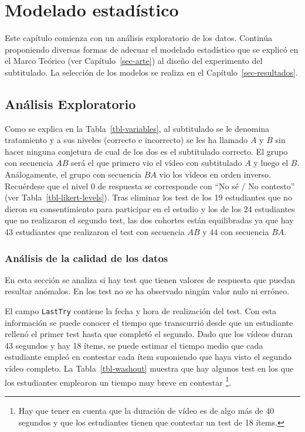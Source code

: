 \documentclass[
  12pt,
  a4paper,
  extrafontsizes,
  onecolumn,
  openright,
  table]{memoir}
\begin{document}
\hypertarget{sec-modelado}{%
\chapter{Modelado estadístico}\label{sec-modelado}}

Este capítulo comienza con un análisis exploratorio de los datos.
Continúa proponiendo diversas formas de adecuar el modelado estadístico
que se explicó en el Marco Teórico (ver Capítulo~\ref{sec-arte}) al
diseño del experimento del subtitulado. La selección de los modelos se
realiza en el Capítulo~\ref{sec-resultados}.

\hypertarget{sec-eda}{%
\section{Análisis Exploratorio}\label{sec-eda}}

Como se explica en la Tabla~\ref{tbl-variables}, al subtitulado se le
denomina tratamiento y a sus niveles (correcto e incorrecto) se les ha
llamado \(A\) y \(B\) sin hacer ninguna conjetura de cual de los dos es
el subtitulado correcto. El grupo con secuencia \(AB\) será el que
primero vio el vídeo con subtitulado \(A\) y luego el \(B\).
Análogamente, el grupo con secuencia \(BA\) vio los vídeos en orden
inverso. Recuérdese que el nivel 0 de respuesta se corresponde con
\enquote{No sé / No contesto} (ver Tabla~\ref{tbl-likert-levels}). Tras
eliminar los test de los 19 estudiantes que no dieron su consentimiento
para participar en el estudio y los de los 24 estudiantes que no
realizaron el segundo test, las dos cohortes están equilibradas ya que
hay 43 estudiantes que realizaron el test con secuencia \(AB\) y 44 con
secuencia \(BA\).

\hypertarget{anuxe1lisis-de-la-calidad-de-los-datos}{%
\subsection{Análisis de la calidad de los
datos}\label{anuxe1lisis-de-la-calidad-de-los-datos}}

En esta sección se analiza si hay test que tienen valores de respuesta
que puedan resultar anómalos. En los test no se ha observado ningún
valor nulo ni erróneo.

El campo \texttt{LastTry} contiene la fecha y hora de realización del
test. Con esta información se puede conocer el tiempo que transcurrió
desde que un estudiante rellenó el primer test hasta que completó el
segundo. Dado que los vídeos duran 43 segundos y hay 18 ítems, se puede
estimar el tiempo medio que cada estudiante empleó en contestar cada
ítem suponiendo que haya visto el segundo vídeo completo. La
Tabla~\ref{tbl-washout} muestra que hay algunos test en los que los
estudiantes emplearon un tiempo muy breve en contestar \footnote{Hay que
  tener en cuenta que la duración de vídeo es de algo más de 40 segundos
  y que los estudiantes tienen que contestar un test de 18 ítems.}.
\end{document}
